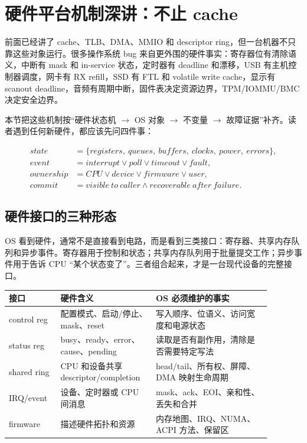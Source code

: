 \section{硬件平台机制深讲：不止 cache}

前面已经讲了 cache、TLB、DMA、MMIO 和 descriptor ring，但一台机器不只靠这些对象运行。很多操作系统 bug 来自更外围的硬件事实：寄存器位有清除语义，中断有 mask 和 in-service 状态，定时器有 deadline 和漂移，USB 有主机控制器调度，网卡有 RX refill，SSD 有 FTL 和 volatile write cache，显示有 scanout deadline，音频有周期中断，固件表决定资源边界，TPM/IOMMU/BMC 决定安全边界。

本节把这些机制按“硬件状态机 \(\rightarrow\) OS 对象 \(\rightarrow\) 不变量 \(\rightarrow\) 故障证据”补齐。读者遇到任何新硬件，都应该先问四件事：

\[
\begin{aligned}
state &= \{registers,\ queues,\ buffers,\ clocks,\ power,\ errors\},\\
event &= interrupt \lor poll \lor timeout \lor fault,\\
ownership &= CPU \lor device \lor firmware \lor user,\\
commit &= visible\ to\ caller \land recoverable\ after\ failure.
\end{aligned}
\]

\subsection{硬件接口的三种形态}

OS 看到硬件，通常不是直接看到电路，而是看到三类接口：寄存器、共享内存队列和异步事件。寄存器用于控制和状态；共享内存队列用于批量提交工作；异步事件用于告诉 CPU “某个状态变了”。三者组合起来，才是一台现代设备的完整接口。

\begin{longtable}{p{0.18\linewidth}p{0.30\linewidth}p{0.40\linewidth}}
\toprule
接口 & 硬件含义 & OS 必须维护的事实 \\
\midrule
control reg & 配置模式、启动/停止、mask、reset & 写入顺序、位语义、访问宽度和电源状态 \\
status reg & busy、ready、error、cause、pending & 读取是否有副作用，清除是否需要特定写法 \\
shared ring & CPU 和设备共享 descriptor/completion & head/tail、所有权、屏障、DMA 映射生命周期 \\
IRQ/event & 设备、定时器或 CPU 间消息 & mask、ack、EOI、亲和性、丢失和合并 \\
firmware & 描述硬件拓扑和资源 & 内存地图、IRQ、NUMA、ACPI 方法、保留区 \\
\bottomrule
\end{longtable}


